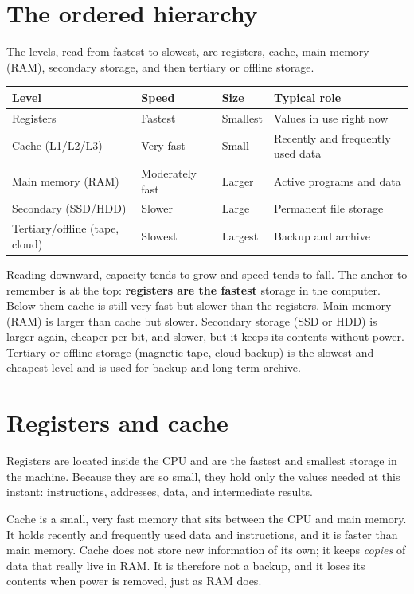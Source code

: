 \documentclass[11pt]{article}
\begin{document}
\section{The ordered hierarchy}
The levels, read from fastest to slowest, are registers, cache, main memory
(RAM), secondary storage, and then tertiary or offline storage.

\begin{center}
\begin{tabular}{p{}p{}p{}p{}}
\toprule
\textbf{Level} & \textbf{Speed} & \textbf{Size} & \textbf{Typical role} \\
\midrule
Registers & Fastest & Smallest & Values in use right now \\
Cache (L1/L2/L3) & Very fast & Small & Recently and frequently used data \\
Main memory (RAM) & Moderately fast & Larger & Active programs and data \\
Secondary (SSD/HDD) & Slower & Large & Permanent file storage \\
Tertiary/offline (tape, cloud) & Slowest & Largest & Backup and archive \\
\bottomrule
\end{tabular}
\end{center}

Reading downward, capacity tends to grow and speed tends to fall. The
anchor to remember is at the top: \textbf{registers are the fastest} storage
in the computer. Below them cache is still very fast but slower than the
registers. Main memory (RAM) is larger than cache but slower. Secondary
storage (SSD or HDD) is larger again, cheaper per bit, and slower, but it
keeps its contents without power. Tertiary or offline storage (magnetic
tape, cloud backup) is the slowest and cheapest level and is used for backup
and long-term archive.

\section{Registers and cache}
Registers are located inside the CPU and are the fastest and smallest
storage in the machine. Because they are so small, they hold only the values
needed at this instant: instructions, addresses, data, and intermediate
results.

Cache is a small, very fast memory that sits between the CPU and main
memory. It holds recently and frequently used data and instructions, and it
is faster than main memory. Cache does not store new information of its own;
it keeps \emph{copies} of data that really live in RAM. It is therefore not
a backup, and it loses its contents when power is removed, just as RAM does.
\end{document}
